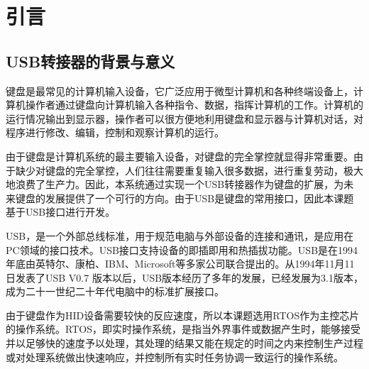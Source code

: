 
\chapter{引言}
\section{USB转接器的背景与意义}
键盘是最常见的计算机输入设备，它广泛应用于微型计算机和各种终端设备上，计算机操作者通过键盘向计算机输入各种指令、数据，指挥计算机的工作。计算机的运行情况输出到显示器，操作者可以很方便地利用键盘和显示器与计算机对话，对程序进行修改、编辑，控制和观察计算机的运行。

由于键盘是计算机系统的最主要输入设备，对键盘的完全掌控就显得非常重要。由于缺少对键盘的完全掌控，人们往往需要重复输入很多数据，进行重复劳动，极大地浪费了生产力。因此，本系统通过实现一个USB转接器作为键盘的扩展，为未来键盘的发展提供了一个可行的方向。由于USB是键盘的常用接口，因此本课题基于USB接口进行开发。

\gls{USB}，是一个外部总线标准，用于规范电脑与外部设备的连接和通讯，是应用在PC领域的接口技术。USB接口支持设备的即插即用和热插拔功能。\gls{USB}是在1994年底由英特尔、康柏、IBM、Microsoft等多家公司联合提出的。从1994年11月11日发表了USB V0.7 版本以后，USB版本经历了多年的发展，已经发展为3.1版本，成为二十一世纪二十年代电脑中的标准扩展接口。

由于键盘作为\gls{HID}设备需要较快的反应速度，所以本课题选用\gls{RTOS}作为主控芯片的操作系统。\gls{RTOS}，即实时操作系统，是指当外界事件或数据产生时，能够接受并以足够快的速度予以处理，其处理的结果又能在规定的时间之内来控制生产过程或对处理系统做出快速响应，并控制所有实时任务协调一致运行的操作系统。


